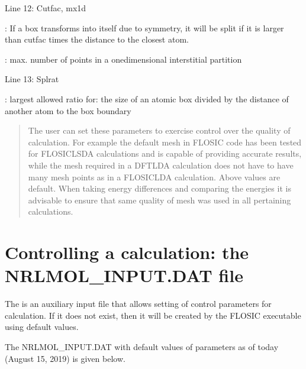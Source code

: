 \documentclass[letterpaper,10pt,english,openany,oneside]{sphinxmanual}
\begin{document}
\sphinxAtStartPar
Line 12: Cutfac, mx1d

\sphinxAtStartPar
{}: If a box transforms into itself due to symmetry, it will be split if it is larger than cutfac times the distance to the closest atom.

\sphinxAtStartPar
{}: max. number of points in a one\sphinxhyphen{}dimensional interstitial partition

\sphinxAtStartPar
Line 13: Splrat

\sphinxAtStartPar
{}: largest allowed ratio for: the size of an atomic box divided by the distance of another atom to the box boundary
\begin{quote}

\sphinxAtStartPar
The user can set these parameters to exercise control over the quality of calculation. For example the default mesh in FLOSIC code has been tested for FLO\sphinxhyphen{}SIC\sphinxhyphen{}LSDA calculations and is capable of providing accurate results, while the mesh required in a DFT\sphinxhyphen{}LDA calculation does not have to have many mesh points as in a FLO\sphinxhyphen{}SIC\sphinxhyphen{}LDA calculation. Above values are default.  When taking energy differences and comparing the energies it is advisable to ensure that same quality of mesh was used in all pertaining calculations.
\end{quote}

\sphinxstepscope


\section{Controlling a calculation: the NRLMOL\_INPUT.DAT file}
\label{\detokenize{docs/Reference/nrlmolinputdat:controlling-a-calculation-the-nrlmol-input-dat-file}}\label{\detokenize{docs/Reference/nrlmolinputdat:nrlmolinput}}\label{\detokenize{docs/Reference/nrlmolinputdat::doc}}
\sphinxAtStartPar
The  is an auxiliary input file that allows setting of control parameters for calculation.  If it does not exist, then it will be
created by the FLOSIC executable using default values.

\sphinxAtStartPar
The NRLMOL\_INPUT.DAT with default values of parameters as of today (August 15, 2019) is given below.
\end{document}
